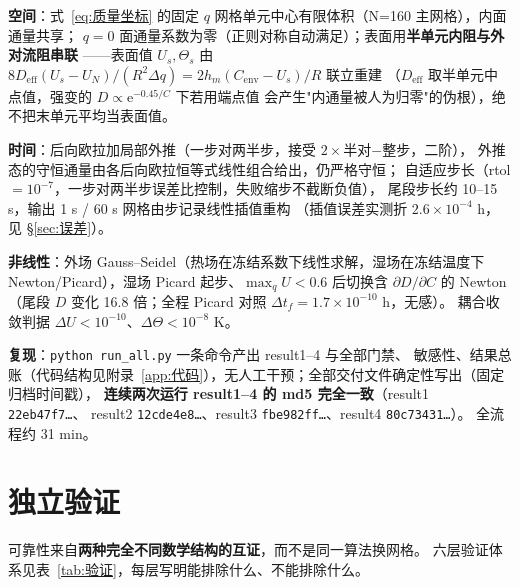\documentclass[12pt,a4paper]{ctexart}
\numberwithin{equation}{section}
\begin{document}
\textbf{空间}：式~\eqref{eq:质量坐标} 的固定 $q$ 网格单元中心有限体积（N=160 主网格），内面通量共享；
$q=0$ 面通量系数为零（正则对称自动满足）；表面用\textbf{半单元内阻与外对流阻串联}
——表面值 $U_s,\varTheta_s$ 由
$8D_{\mathrm{eff}}(U_s-U_N)/(R^2\Delta q)=2h_m(C_{\mathrm{env}}-U_s)/R$ 联立重建
（$D_{\mathrm{eff}}$ 取半单元中点值，强变的 $D\propto\mathrm{e}^{-0.45/C}$ 下若用端点值
会产生"内通量被人为归零"的伪根），绝不把末单元平均当表面值。

\textbf{时间}：后向欧拉加局部外推（一步对两半步，接受 $2\times$半对$-$整步，二阶），
外推态的守恒通量由各后向欧拉恒等式线性组合给出，仍严格守恒；
自适应步长（rtol $=10^{-7}$，一步对两半步误差比控制，失败缩步不截断负值），
尾段步长约 10--15 s，输出 1 s / 60 s 网格由步记录线性插值重构
（插值误差实测折 $2.6\times10^{-4}$ h，见 \S\ref{sec:误差}）。

\textbf{非线性}：外场 Gauss--Seidel（热场在冻结系数下线性求解，湿场在冻结温度下
Newton/Picard），湿场 Picard 起步、$\max_qU<0.6$ 后切换含 $\partial D/\partial C$ 的
Newton（尾段 $D$ 变化 16.8 倍；全程 Picard 对照 $\Delta t_f=1.7\times10^{-10}$ h，无感）。
耦合收敛判据 $\Delta U<10^{-10}$、$\Delta\varTheta<10^{-8}$ K。

\textbf{复现}：\texttt{python run\_all.py} 一条命令产出 result1--4 与全部门禁、
敏感性、结果总账（代码结构见附录~\ref{app:代码}），无人工干预；全部交付文件确定性写出（固定归档时间戳），
\textbf{连续两次运行 result1--4 的 md5 完全一致}（result1 \texttt{22eb47f7…}、
result2 \texttt{12cde4e8…}、result3 \texttt{fbe982ff…}、result4 \texttt{80c73431…}）。
全流程约 31 min。

\section{独立验证}\label{sec:验证}
可靠性来自\textbf{两种完全不同数学结构的互证}，而不是同一算法换网格。
六层验证体系见表~\ref{tab:验证}，每层写明能排除什么、不能排除什么。
\end{document}
